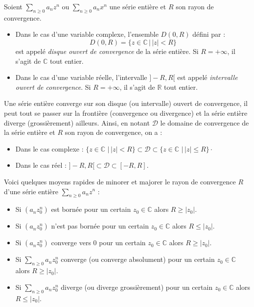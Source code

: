 \documentclass[french,11pt,twoside]{VcCours}
\begin{document}
\begin{Definition}{} Soient $\sum_{n \geq 0} a_n z^n$ ou $\sum_{n \geq 0} a_n x^n$ une série entière et $R$ son rayon de convergence.

\begin{itemize}
\item Dans le cas d'une variable complexe, l'ensemble $D(0,R)$ défini par :
$$ D(0,R)= \lbrace z \in \mathbb{C} \, \vert \, \vert z \vert < R \rbrace$$
est appelé \emph{disque ouvert de convergence} de la série entière. Si $R = + \infty$, il s'agit de $\mathbb{C}$ tout entier.
\item Dans le cas d'une variable réelle, l'intervalle $]-R,R[$ est appelé \emph{intervalle ouvert de convergence}. Si $R = + \infty$, il s'agit de $\mathbb{R}$ tout entier.
\end{itemize}
\end{Definition}

\begin{Remarque}{} Une série entière converge sur son disque (ou intervalle) ouvert de convergence, il peut tout se passer sur la frontière (convergence ou divergence) et la série entière diverge (grossièrement) ailleurs. Ainsi, en notant $\mathcal{D}$ le domaine de convergence de la série entière et $R$ son rayon de convergence, on a :
\begin{itemize}
\item Dans le cas complexe : $\lbrace z \in \mathbb{C} \, \, \vert \, \vert z \vert < R \rbrace \subset \mathcal{D} \subset \lbrace z \in \mathbb{C} \, \, \vert \, \vert z \vert \leq R \rbrace\cdot$
\item Dans le cas réel : $]-R,R[ \subset \mathcal{D} \subset [-R,R]$.
\end{itemize}
\end{Remarque}



Voici quelques moyens rapides de minorer et majorer le rayon de convergence $R$ d'une série entière $\sum_{n \geq 0} a_n z^n$ :

\begin{itemize}
\item Si $(a_n z_0^n)$ est bornée pour un certain $z_0 \in \mathbb{C}$ alors $R \geq \vert z_0 \vert$.
\item Si $(a_n z_0^n)$ n'est pas bornée pour un certain $z_0 \in \mathbb{C}$ alors $R \leq \vert z_0 \vert$.
\item Si $(a_n z_0^n)$ converge vers $0$ pour un certain $z_0 \in \mathbb{C}$ alors $R \geq \vert z_0 \vert$.
\item Si $\sum_{n \geq 0} a_n z_0^n$ converge (ou converge absolument) pour un certain $z_0 \in \mathbb{C}$ alors $R \geq \vert z_0 \vert$.
\item Si $\sum_{n \geq 0} a_n z_0^n$ diverge (ou diverge grossièrement) pour un certain $z_0 \in \mathbb{C}$ alors $R \leq \vert z_0 \vert$.
\end{itemize}
\end{document}

